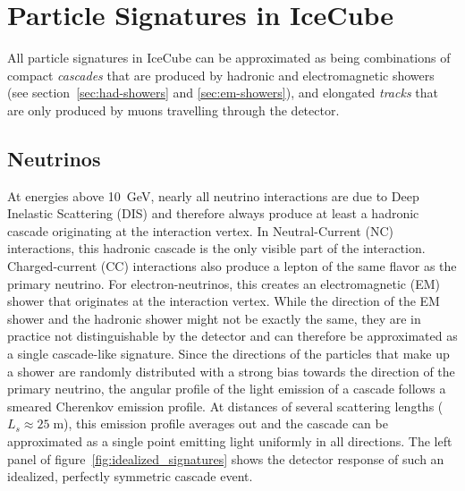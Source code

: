 \section{Particle Signatures in IceCube}
\label{sec:particle-signatures}
All particle signatures in IceCube can be approximated as being combinations of compact \emph{cascades} that are produced by hadronic and electromagnetic showers (see section~\ref{sec:had-showers} and \ref{sec:em-showers}), and elongated \emph{tracks} that are only produced by muons travelling through the detector.

\subsection{Neutrinos}

At energies above 10~GeV, nearly all neutrino interactions are due to Deep Inelastic Scattering (DIS) and therefore always produce at least a hadronic cascade originating at the interaction vertex.
In Neutral-Current (NC) interactions, this hadronic cascade is the only visible part of the interaction.
Charged-current (CC) interactions also produce a lepton of the same flavor as the primary neutrino.
For electron-neutrinos, this creates an electromagnetic (EM) shower that originates at the interaction vertex.
While the direction of the EM shower and the hadronic shower might not be exactly the same, they are in practice not distinguishable by the detector and can therefore be approximated as a single cascade-like signature.
Since the directions of the particles that make up a shower are randomly distributed with a strong bias towards the direction of the primary neutrino, the angular profile of the light emission of a cascade follows a smeared Cherenkov emission profile.
At distances of several scattering lengths ($L_s\approx25\;\mathrm{m}$), this emission profile averages out and the cascade can be approximated as a single point emitting light uniformly in all directions.
The left panel of figure~\ref{fig:idealized_signatures} shows the detector response of such an idealized, perfectly symmetric cascade event.
